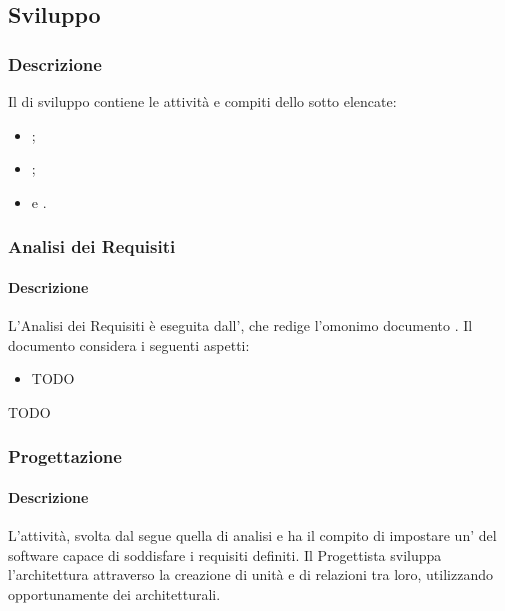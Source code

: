 \subsection{Sviluppo}\label{sviluppo}

\subsubsection{Descrizione}
Il  di sviluppo contiene le attività e compiti dello  sotto elencate:
\begin{itemize}
  \item {};
  \item {};
  \item {} e .
\end{itemize}


\subsubsection{Analisi dei Requisiti}
\paragraph{Descrizione}
L'Analisi dei Requisiti è eseguita dall'\glossario{\Analista}, che redige l'omonimo documento \AnalisiDeiRequisiti. Il documento considera i seguenti aspetti:
\begin{itemize}
  \item TODO %
\end{itemize}

TODO %

\subsubsection{Progettazione}
\paragraph{Descrizione}
L'attività, svolta dal \glossario{\Progettista} segue quella di analisi e ha il compito di impostare un' del software capace di soddisfare i requisiti definiti. Il Progettista sviluppa l'architettura attraverso la creazione di unità e di relazioni tra loro, utilizzando opportunamente dei  architetturali.\\

